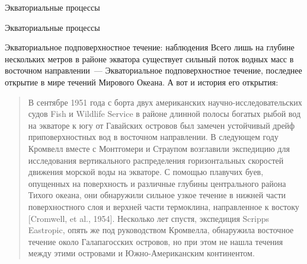 \begin{chapter}{Экваториальные процессы}
\begin{section}{Экваториальные процессы}
\begin{paragraph}{Экваториальное подповерхностное течение: наблюдения}
Всего лишь на глубине нескольких метров в районе экватора существует
сильный поток водных масс в восточном направлении~--- Экваториальное
подповерхностное течение, последнее открытие в мире течений Мирового
Океана. А вот и история его открытия:
%
\begin{quotation}
В сентябре 1951 года с борта двух американских
научно-исследовательских судов Fish и Wildlife Service в районе
длинной полосы богатых рыбой вод на экваторе к югу от Гавайских
островов был замечен устойчивый дрейф приповерхностных вод в восточном
направлении.  В следующем году Кромвелл вместе с Монтгомери и Страупом
возглавили экспедицию для исследования вертикального распределения
горизонтальных скоростей движения морской воды на экваторе. С помощью
плавучих буев, опущенных на поверхность и различные глубины
центрального района Тихого океана, они обнаружили сильное узкое
течение в нижней части поверхностного слоя и верхней части термоклина,
направленное к востоку [Cromwell, et al., 1954]. Несколько лет спустя,
экспедиция Scripps Eastropic, опять же под руководством Кромвелла,
обнаружила восточное течение около Галапагосских островов, но при этом
не нашла течения между этими островами и Южно-Американским
континентом.
%


\end{quotation}
\end{paragraph}
\end{section}
\end{chapter}
